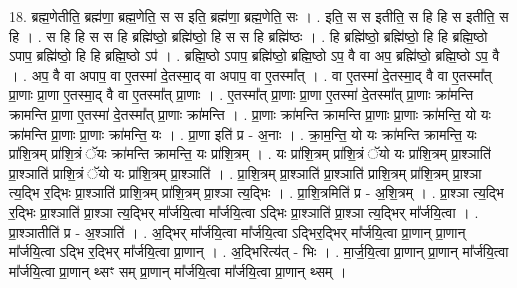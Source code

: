 \documentclass[17pt]{extarticle}
\begin{document}
18. ब्रह्म॒णेतीति॒ ब्रह्म॑णा॒ ब्रह्म॒णेति॒ स स इति॒ ब्रह्म॑णा॒ ब्रह्म॒णेति॒ सः । . इति॒ स स इतीति॒ स हि हि स इतीति॒ स हि । . स हि हि स स हि ब्रह्मि॑ष्ठो॒ ब्रह्मि॑ष्ठो॒ हि स स हि ब्रह्मि॑ष्ठः । . हि ब्रह्मि॑ष्ठो॒ ब्रह्मि॑ष्ठो॒ हि हि ब्रह्मि॒ष्ठो ऽपाप॒ ब्रह्मि॑ष्ठो॒ हि हि ब्रह्मि॒ष्ठो ऽप॑ । . ब्रह्मि॒ष्ठो ऽपाप॒ ब्रह्मि॑ष्ठो॒ ब्रह्मि॒ष्ठो ऽप॒ वै वा अप॒ ब्रह्मि॑ष्ठो॒ ब्रह्मि॒ष्ठो ऽप॒ वै । . अप॒ वै वा अपाप॒ वा ए॒तस्मा॑ दे॒तस्मा॒द् वा अपाप॒ वा ए॒तस्मा᳚त् । . वा ए॒तस्मा॑ दे॒तस्मा॒द् वै वा ए॒तस्मा᳚त् प्रा॒णाः प्रा॒णा ए॒तस्मा॒द् वै वा ए॒तस्मा᳚त् प्रा॒णाः । . ए॒तस्मा᳚त् प्रा॒णाः प्रा॒णा ए॒तस्मा॑ दे॒तस्मा᳚त् प्रा॒णाः क्रा॑मन्ति क्रामन्ति प्रा॒णा ए॒तस्मा॑ दे॒तस्मा᳚त् प्रा॒णाः क्रा॑मन्ति । . प्रा॒णाः क्रा॑मन्ति क्रामन्ति प्रा॒णाः प्रा॒णाः क्रा॑मन्ति॒ यो यः क्रा॑मन्ति प्रा॒णाः प्रा॒णाः क्रा॑मन्ति॒ यः । . प्रा॒णा इति॑ प्र - अ॒नाः । . क्रा॒म॒न्ति॒ यो यः क्रा॑मन्ति क्रामन्ति॒ यः प्रा॑शि॒त्रम् प्रा॑शि॒त्रं ॅयः क्रा॑मन्ति क्रामन्ति॒ यः प्रा॑शि॒त्रम् । . यः प्रा॑शि॒त्रम् प्रा॑शि॒त्रं ॅयो यः प्रा॑शि॒त्रम् प्रा॒श्ञाति॑ प्रा॒श्ञाति॑ प्राशि॒त्रं ॅयो यः प्रा॑शि॒त्रम् प्रा॒श्ञाति॑ । . प्रा॒शि॒त्रम् प्रा॒श्ञाति॑ प्रा॒श्ञाति॑ प्राशि॒त्रम् प्रा॑शि॒त्रम् प्रा॒श्ञा त्य॒द्भि र॒द्भिः प्रा॒श्ञाति॑ प्राशि॒त्रम् प्रा॑शि॒त्रम् प्रा॒श्ञा त्य॒द्भिः । . प्रा॒शि॒त्रमिति॑ प्र - अ॒शि॒त्रम् । . प्रा॒श्ञा त्य॒द्भि र॒द्भिः प्रा॒श्ञाति॑ प्रा॒श्ञा त्य॒द्भिर् मा᳚र्जयि॒त्वा मा᳚र्जयि॒त्वा ऽद्भिः प्रा॒श्ञाति॑ प्रा॒श्ञा त्य॒द्भिर् मा᳚र्जयि॒त्वा । . प्रा॒श्ञातीति॑ प्र - अ॒श्ञाति॑ । . अ॒द्भिर् मा᳚र्जयि॒त्वा मा᳚र्जयि॒त्वा ऽद्भिर॒द्भिर् मा᳚र्जयि॒त्वा प्रा॒णान् प्रा॒णान् मा᳚र्जयि॒त्वा ऽद्भि र॒द्भिर् मा᳚र्जयि॒त्वा प्रा॒णान् । . अ॒द्भिरित्य॑त् - भिः । . मा॒र्ज॒यि॒त्वा प्रा॒णान् प्रा॒णान् मा᳚र्जयि॒त्वा मा᳚र्जयि॒त्वा प्रा॒णान् थ्सꣳ सम् प्रा॒णान् मा᳚र्जयि॒त्वा मा᳚र्जयि॒त्वा प्रा॒णान् थ्सम् । \newline
\end{document}
